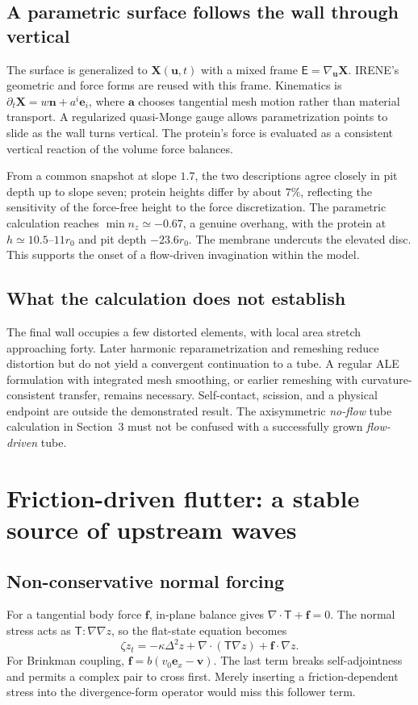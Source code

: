 \subsection{A parametric surface follows the wall through vertical}
The surface is generalized to $\bm X(\bm u,t)$ with a mixed frame $\mathsf E=\nabla_{\bm u}\bm X$. IRENE's geometric and force forms are reused with this frame. Kinematics is $\partial_t\bm X=w\bm n+a^i\bm e_i$, where $\bm a$ chooses tangential mesh motion rather than material transport. A regularized quasi-Monge gauge allows parametrization points to slide as the wall turns vertical. The protein's force is evaluated as a consistent vertical reaction of the volume force balances.

From a common snapshot at slope $1.7$, the two descriptions agree closely in pit depth up to slope seven; protein heights differ by about $7\%$, reflecting the sensitivity of the force-free height to the force discretization. The parametric calculation reaches $\min n_z\simeq-0.67$, a genuine overhang, with the protein at $h\simeq10.5$--$11r_0$ and pit depth $-23.6r_0$. The membrane undercuts the elevated disc. This supports the onset of a flow-driven invagination within the model.

\subsection{What the calculation does not establish}
The final wall occupies a few distorted elements, with local area stretch approaching forty. Later harmonic reparametrization and remeshing reduce distortion but do not yield a convergent continuation to a tube. A regular ALE formulation with integrated mesh smoothing, or earlier remeshing with curvature-consistent transfer, remains necessary. Self-contact, scission, and a physical endpoint are outside the demonstrated result. The axisymmetric \emph{no-flow} tube calculation in Section~3 must not be confused with a successfully grown \emph{flow-driven} tube.

\clearpage
\section{Friction-driven flutter: a stable source of upstream waves}
\subsection{Non-conservative normal forcing}
For a tangential body force $\bm f$, in-plane balance gives $\nabla\cdot\mathsf T+\bm f=0$. The normal stress acts as $\mathsf T:\nabla\nabla z$, so the flat-state equation becomes
\begin{equation}
\zeta z_t=-\kappa\Delta^2z+\nabla\cdot(\mathsf T\nabla z)+\bm f\cdot\nabla z.\label{eq:follower}
\end{equation}
For Brinkman coupling, $\bm f=b(v_0\bm e_x-\bm v)$. The last term breaks self-adjointness and permits a complex pair to cross first. Merely inserting a friction-dependent stress into the divergence-form operator would miss this follower term.

